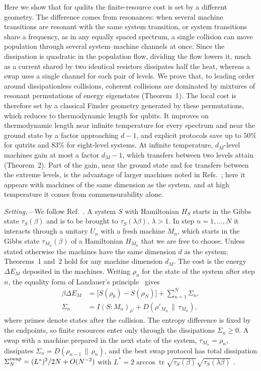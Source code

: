\documentclass[aps,prl,reprint,superscriptaddress,amsmath,amssymb]{revtex4-2}
\newcommand{\Tr}{\operatorname{tr}}
\newcommand{\Dr}[2]{D(#1\,\|\,#2)}
\begin{document}
Here we show that for qudits the finite-resource cost is set by a different geometry. The difference comes from
resonances: when several machine transitions are resonant with the same system transition, or system transitions share
a frequency, as in any equally spaced spectrum, a single collision can move population through several system--machine
channels at once. Since the dissipation is quadratic in the population flow, dividing the flow lowers it, much as a
current shared by two identical resistors dissipates half the heat, whereas a swap uses a single channel for each pair
of levels. We prove that, to leading order around dissipationless collisions, coherent collisions are dominated by
mixtures of resonant permutations of energy eigenstates (Theorem~1). The local cost is therefore set by a classical
Finsler geometry generated by these permutations, which reduces to thermodynamic length for qubits. It improves on
thermodynamic length near infinite temperature for every spectrum and near the ground state by a factor approaching
$d-1$, and explicit protocols save up to $50\%$ for qutrits and $83\%$ for eight-level systems. At infinite
temperature, $d_M$-level machines gain at most a factor $d_M-1$, which transfers between two levels attain
(Theorem~2). Part of the gain, near the ground state and for transfers between the extreme levels, is the advantage of
larger machines noted in Refs.~\cite{Taranto2025,Silva2016}; here it appears with machines of the same dimension as the
system, and at high temperature it comes from commensurability alone.

\emph{Setting.}---We follow Ref.~\cite{Taranto2025}. A system $S$ with Hamiltonian $H_S$ starts in the Gibbs state
$\tau_S(\beta)$ and is to be brought to $\tau_S(\lambda\beta)$, $\lambda>1$. In step $n=1,\dots,N$ it interacts through
a unitary $U_n$ with a fresh machine $M_n$, which starts in the Gibbs state $\tau_{M_n}(\beta)$ of a Hamiltonian
$H_{M_n}$ that we are free to choose. Unless stated otherwise the machines have the same dimension $d$ as the system;
Theorems~1 and~2 hold for any machine dimension $d_M$. The cost is the energy $\Delta E_M$ deposited in the machines.
Writing $\rho_{n}$ for the state of the system after step $n$, the equality form of Landauer's
principle~\cite{ReebWolf2014,Esposito2010,LandiPaternostro2021} gives
\begin{align}
\beta\Delta E_M &= \big[S(\rho_0)-S(\rho_N)\big] + \sum_{n=1}^N \Sigma_n, \label{eq:landauer}\\
\Sigma_n &= I(S\!:\!M_n)_{\rho'} + \Dr{\rho'_{M_n}}{\tau_{M_n}}, \nonumber
\end{align}
where primes denote states after the collision. The entropy difference is fixed by the endpoints, so finite resources
enter only through the dissipations $\Sigma_n\geq 0$. A swap with a machine prepared in the next state of the system,
$\tau_{M_n}=\rho_n$, dissipates $\Sigma_n=\Dr{\rho_{n-1}}{\rho_n}$, and the best swap protocol has total dissipation
$\Sigma^{\rm swap}_N=(L^*)^2/2N+O(N^{-2})$ with $L^* = 2\arccos \Tr\sqrt{\tau_S(\beta)}\sqrt{\tau_S(\lambda\beta)}$
\cite{Taranto2025}.
\end{document}
